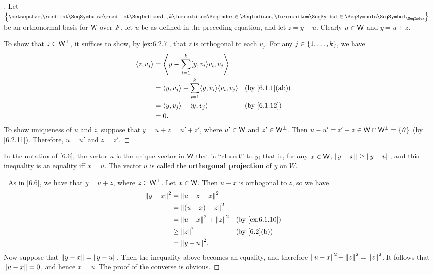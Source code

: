 \begin{proof}[]
	Let \(\set{\seq{v}{1,,k}}\) be an orthonormal basis for \(\mathsf{W}\) over \(\mathit{F}\), let \(u\) be as defined in the preceding equation, and let \(z = y - u\).
	Clearly \(u \in \mathsf{W}\) and \(y = u + z\).

	To show that \(z \in \mathsf{W}^{\perp}\), it suffices to show, by \cref{ex:6.2.7}, that \(z\) is orthogonal to each \(v_j\).
	For any \(j \in \left\lbrace1, \dots, k\right\rbrace\), we have
	\begin{align*}
		\inn{z, v_j} & = \inn{y - \sum_{i = 1}^k \inn{y, v_i} v_i, v_j}                                \\
		             & = \inn{y, v_j} - \sum_{i = 1}^k \inn{y, v_i} \inn{v_i, v_j} &  & \by{6.1.1}[ab] \\
		             & = \inn{y, v_j} - \inn{y, v_j}                               &  & \by{6.1.12}    \\
		             & = 0.
	\end{align*}
	To show uniqueness of \(u\) and \(z\), suppose that \(y = u + z = u' + z'\), where \(u' \in \mathsf{W}\) and \(z' \in \mathsf{W}^{\perp}\).
	Then \(u - u' = z' - z \in \mathsf{W} \cap \mathsf{W}^{\perp} = \left\lbrace\mathit{0}\right\rbrace\) (by \cref{6.2.11}).
	Therefore, \(u = u'\) and \(z = z'\).
\end{proof}

\begin{cor}\label{6.2.12}
	In the notation of \cref{6.6}, the vector \(u\) is the unique vector in \(\mathsf{W}\) that is ``closest'' to \(y\);
	that is, for any \(x \in \mathsf{W}\), \(\left\lVert y - x\right\rVert \geq \left\lVert y - u\right\rVert\), and this inequality is an equality iff \(x = u\).
	The vector \(u\) is called the \textbf{orthogonal projection} of \(y\) on \(W\).
\end{cor}

\begin{proof}[]
	As in \cref{6.6}, we have that \(y = u + z\), where \(z \in \mathsf{W}^{\perp}\).
	Let \(x \in \mathsf{W}\).
	Then \(u - x\) is orthogonal to \(z\), so we have
	\begin{align*}
		\norm{y - x}^2 & = \norm{u + z - x}^2                              \\
		               & = \norm{(u - x) + z}^2                            \\
		               & = \norm{u - x}^2 + \norm{z}^2 &  & \by{ex:6.1.10} \\
		               & \geq \norm{z}^2               &  & \by{6.2}[b]    \\
		               & = \norm{y - u}^2.
	\end{align*}
	Now suppose that \(\left\lVert y - x\right\rVert = \left\lVert y - u\right\rVert\).
	Then the inequality above becomes an equality, and therefore \(\left\lVert u - x\right\rVert^2 + \left\lVert z\right\rVert^2 = \left\lVert z\right\rVert^2\).
	It follows that \(\left\lVert u - x\right\rVert = 0\), and hence \(x = u\).
	The proof of the converse is obvious.
\end{proof}

